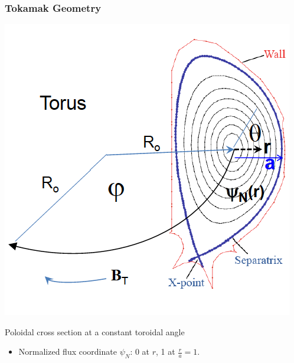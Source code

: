 \documentclass[11pt]{beamer}
\begin{document}
\begin{frame}
\frametitle{Tokamak Geometry}
\vspace*{-.5in}

\centerline{ \includegraphics[height=.6 \textheight]{torus_coord.png}}

\centerline{Poloidal cross section at a constant toroidal angle}

\begin{itemize}
\item Normalized flux coordinate $\psi_N$: 0 at $r$, 1 at $\frac{r}{a}=1$.
\end{itemize}


\end{frame}
\end{document}
